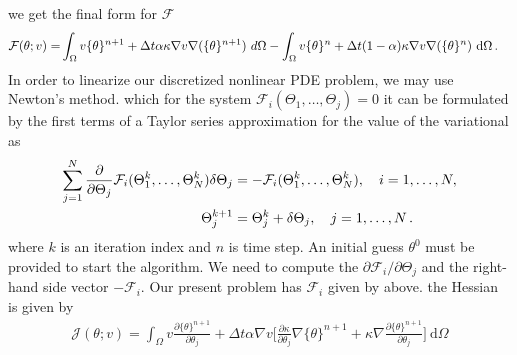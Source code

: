 \documentclass[]{article}
\begin{document}
we get the final form for $\mathcal{F}$
\begin{equation}\label{eq13}
	\begin{aligned}
		\mathcal{F}(\theta; v) =& \int_{\Omega} v \{\theta\}^{n+1} + \Delta t \alpha\kappa\nabla v \nabla(\{ \theta\}^{n+1}) \ d \Omega - \int_{\Omega} v\{\theta\}^{n} + \Delta t (1-\alpha) \kappa\nabla v\nabla(\{ \theta\}^{n}) \ \mathrm{d} \Omega\thinspace.
	\end{aligned}
\end{equation}
In order to linearize our discretized nonlinear PDE problem, we may use Newton’s method. which for the system $\mathcal{F}_i(\Theta_1,\ldots,\Theta_j)=0$ it can be formulated by the first terms of a Taylor series approximation for the value of the variational as
\begin{equation}\label{eq14}
	\begin{aligned}
		\sum_{j=1}^N {\partial \over\partial \Theta_j} \mathcal{F}_i(\Theta_1^k,\ldots,\Theta_N^k)\delta \Theta_j &= -\mathcal{F}_i(\Theta_1^k,\ldots,\Theta_N^k),\quad i=1, \ldots ,N,\\ \Theta_j^{k+1} &= \Theta_j^k + \delta \Theta_j,\quad j=1, \ldots ,N\thinspace.
	\end{aligned}
\end{equation}
where $k$ is an iteration index and $n$ is time step. An initial guess $\theta^0$ must be provided to start the algorithm.
We need to compute the $\partial \mathcal{F}_i/\partial \Theta_j$ and the right-hand side vector $-\mathcal{F}_i$. Our present problem has $\mathcal{F}_i$ given by above. the Hessian is given by
\begin{equation}\label{eq15}
	\begin{aligned}
		\mathcal{J}(\theta;v)= \int_{\Omega} v \frac{\partial \{\theta\}^{n+1}}{\partial \theta_j} + \Delta t \alpha  \nabla v \Bigg[\frac{\partial \kappa}{\partial \theta_j}\nabla \{\theta\}^{n+1} +  \kappa\nabla \frac{\partial \{\theta\}^{n+1}}{\partial \theta_j}\Bigg] \ \mathrm{d} \Omega
	\end{aligned}
\end{equation}
\end{document}
